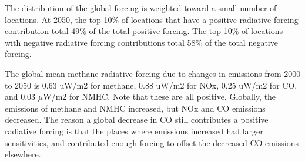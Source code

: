 The distribution of the global forcing is weighted toward a small number of locations. At 2050, the top 10\% of locations that have a positive radiative forcing contribution total 49\% of the total positive forcing. The top 10\% of locations with negative radiative forcing contributions total 58\% of the total negative forcing.

The global mean methane radiative forcing due to changes in emissions from 2000 to 2050 is 0.63 uW/m2 for methane, 0.88 uW/m2 for NOx, 0.25 uW/m2 for CO, and 0.03 $\mu $W/m2 for NMHC. Note that these are all positive. Globally, the emissions of methane and NMHC increased, but NOx and CO emissions decreased. The reason a global decrease in CO still contributes a positive radiative forcing is that the places where emissions increased had larger sensitivities, and contributed enough forcing to offset the decreased CO emissions elsewhere.

